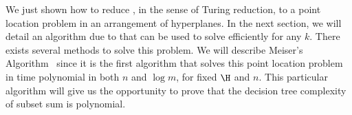 We just shown how to reduce \kSUM, in the sense of Turing reduction, to a
point location problem in an arrangement of hyperplanes. In the next section,
we will detail an algorithm due to \citet*{meiser:1993} that can be used to
solve \kSUM efficiently for any $k$.  There exists several methods to solve
this problem. We will describe Meiser's Algorithm~\cite{meiser:1993} since it
is the first algorithm that solves this point location problem in time
polynomial in both $n$ and $\log m$, for fixed $\H$ and $n$. This particular
algorithm will give us the opportunity to prove that the decision tree complexity
of subset sum is polynomial.

